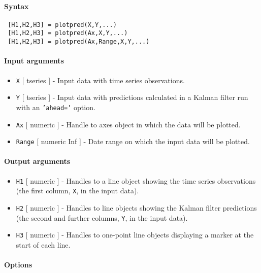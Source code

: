 


	\paragraph{Syntax}
 
 \begin{verbatim}
 [H1,H2,H3] = plotpred(X,Y,...)
 [H1,H2,H3] = plotpred(Ax,X,Y,...)
 [H1,H2,H3] = plotpred(Ax,Range,X,Y,...)
 \end{verbatim}
 
 \paragraph{Input arguments}
 
 \begin{itemize}
 \item
   \texttt{X} {[} tseries {]} - Input data with time series observations.
 \item
   \texttt{Y} {[} tseries {]} - Input data with predictions calculated in
   a Kalman filter run with an \texttt{'ahead='} option.
 \item
   \texttt{Ax} {[} numeric {]} - Handle to axes object in which the data
   will be plotted.
 \item
   \texttt{Range} {[} numeric \textbar{} Inf {]} - Date range on which
   the input data will be plotted.
 \end{itemize}
 
 \paragraph{Output arguments}
 
 \begin{itemize}
 \item
   \texttt{H1} {[} numeric {]} - Handles to a line object showing the
   time series observations (the first column, \texttt{X}, in the input
   data).
 \item
   \texttt{H2} {[} numeric {]} - Handles to line objects showing the
   Kalman filter predictions (the second and further columns, \texttt{Y},
   in the input data).
 \item
   \texttt{H3} {[} numeric {]} - Handles to one-point line objects
   displaying a marker at the start of each line.
 \end{itemize}
 
 \paragraph{Options}
 

